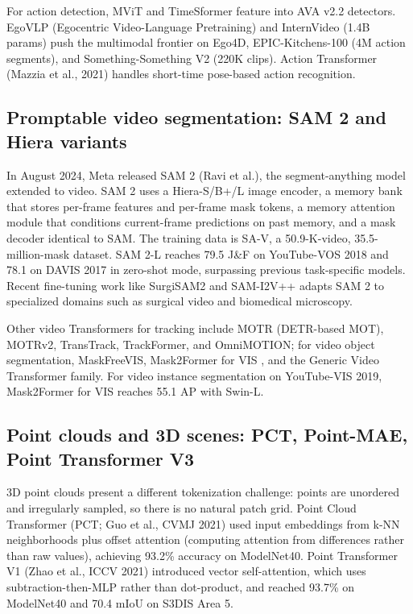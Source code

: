 \documentclass{article}
\begin{document}
For action detection, MViT and TimeSformer feature into AVA v2.2 detectors. EgoVLP (Egocentric Video-Language Pretraining) and InternVideo (1.4B params) push the multimodal frontier on Ego4D, EPIC-Kitchens-100 (4M action segments), and Something-Something V2 (220K clips). Action Transformer (Mazzia et al., 2021) handles short-time pose-based action recognition.

\subsection{Promptable video segmentation: SAM 2 and Hiera variants}\label{promptable-video-segmentation-sam-2-and-hiera-variants}

In August 2024, Meta released SAM 2 (Ravi et al.), the segment-anything model extended to video. SAM 2 uses a Hiera-S/B+/L image encoder, a memory bank that stores per-frame features and per-frame mask tokens, a memory attention module that conditions current-frame predictions on past memory, and a mask decoder identical to SAM. The training data is SA-V, a 50.9-K-video, 35.5-million-mask dataset. SAM 2-L reaches 79.5 J\&F on YouTube-VOS 2018 and 78.1 on DAVIS 2017 in zero-shot mode, surpassing previous task-specific models. Recent fine-tuning work like SurgiSAM2 and SAM-I2V++ adapts SAM 2 to specialized domains such as surgical video and biomedical microscopy.

Other video Transformers for tracking include MOTR (DETR-based MOT), MOTRv2, TransTrack, TrackFormer, and OmniMOTION; for video object segmentation, MaskFreeVIS, Mask2Former for VIS \citep{cheng2021perpixelclassifica}, and the Generic Video Transformer family. For video instance segmentation on YouTube-VIS 2019, Mask2Former for VIS reaches 55.1 AP with Swin-L.

\subsection{Point clouds and 3D scenes: PCT, Point-MAE, Point Transformer V3}\label{point-clouds-and-3d-scenes-pct-point-mae-point-transformer-v3}

3D point clouds present a different tokenization challenge: points are unordered and irregularly sampled, so there is no natural patch grid. Point Cloud Transformer (PCT; Guo et al., CVMJ 2021) used input embeddings from k-NN neighborhoods plus offset attention (computing attention from differences rather than raw values), achieving 93.2\% accuracy on ModelNet40. Point Transformer V1 (Zhao et al., ICCV 2021) introduced vector self-attention, which uses subtraction-then-MLP rather than dot-product, and reached 93.7\% on ModelNet40 and 70.4 mIoU on S3DIS Area 5.
\end{document}
